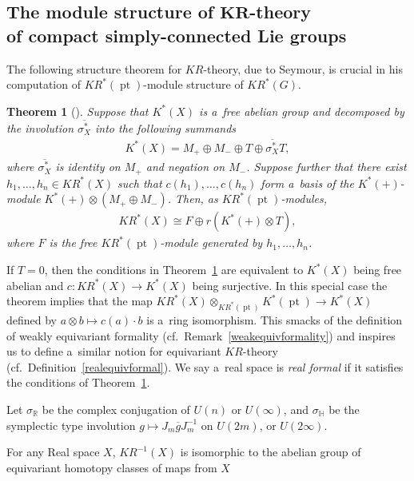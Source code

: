 \documentclass[pdftex]{sigma}
\numberwithin{equation}{section}
\newtheorem{Theorem}{Theorem}[section]
\DeclareMathOperator{\pt}{pt}
\begin{document}
\subsection[The module structure of $KR$-theory of compact simply-connected Lie groups]{The
module structure of $\boldsymbol{KR}$-theory\\ of compact simply-connected Lie groups}
The following structure theorem for $KR$-theory, due to Seymour, is crucial in his computation of
$KR^*(\pt)$-module structure of $KR^*(G)$.
\begin{Theorem}[{\cite[Theorem 4.2]{Se}}]\label{strthm}
Suppose that $K^*(X)$ is a~free abelian group and decomposed by the involution $\overline{\sigma_X^*}$ into the following summands
\begin{gather*}
K^*(X)=M_+\oplus M_-\oplus T\oplus \overline{\sigma_X^*}T,
\end{gather*}
where $\overline{\sigma_X^*}$ is identity on $M_+$ and negation on $M_-$.
Suppose further that there exist $h_1, \dots, h_n\in KR^*(X)$ such that $c(h_1), \dots, c(h_n)$ form a~basis of the
$K^*(+)$-module $K^*(+)\otimes(M_+\oplus M_-)$.
Then, as $KR^*(\pt)$-modules,
\begin{gather*}
KR^*(X)\cong F\oplus r(K^*(+)\otimes T),
\end{gather*}
where $F$ is the free $KR^*(\pt)$-module generated by $h_1, \dots, h_n$.
\end{Theorem}
\begin{Remark}
If $T=0$, then the conditions in Theorem~\ref{strthm} are equivalent to $K^*(X)$ being free abelian and $c: KR^*(X)\to
K^*(X)$ being surjective.
In this special case the theorem
implies that the map $KR^*(X)\otimes_{KR^*(\pt)}K^*(\pt)\to K^*(X)$ def\/ined
by $a\otimes b\mapsto c(a)\cdot b$ is a~ring isomorphism.
This smacks of the def\/inition of weakly equivariant formality (cf.\ Remark~\ref{weakequivformality}) and inspires us to
def\/ine a~similar notion for equivariant $KR$-theory (cf.\ Def\/inition~\ref{realequivformal}).
We say a~real space is \emph{real formal} if it satisf\/ies the conditions of Theorem~\ref{strthm}.
\end{Remark}
\begin{Definition}
Let $\sigma_\mathbb{R}$ be the complex conjugation of $U(n)$ or $U(\infty)$,
and $\sigma_\mathbb{H}$ be the symplectic type involution $g\mapsto J_m\overline{g}J_m^{-1}$ on $U(2m)$, or $U(2\infty)$.
\end{Definition}
For any Real space $X$, $KR^{-1}(X)$ is isomorphic to the abelian group of equivariant homotopy classes of maps from $X$
\end{document}
